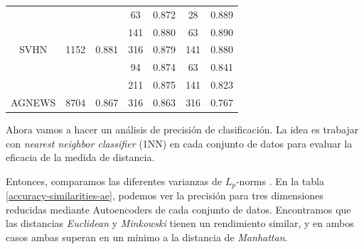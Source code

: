 \begin{table}[]
\begin{tabular}{c|cc|cccc|}
\multicolumn{1}{|c|}{}                          & \cellcolor[HTML]{E6E6E6}                          &                         & \cellcolor[HTML]{E6E6E6}63                        & 0.872                     & \cellcolor[HTML]{E6E6E6}28                        & 0.889 \\
\multicolumn{1}{|c|}{}                          & \cellcolor[HTML]{E6E6E6}                          &                         & \cellcolor[HTML]{E6E6E6}141                       & 0.880                     & \cellcolor[HTML]{E6E6E6}63                        & 0.890 \\
\multicolumn{1}{|c|}{\multirow{-3}{*}{SVHN}}    & \multirow{-3}{*}{\cellcolor[HTML]{E6E6E6}1152}    & \multirow{-3}{*}{0.881} & \cellcolor[HTML]{E6E6E6}316                       & 0.879                     & \cellcolor[HTML]{E6E6E6}141                       & 0.880 \\ \hline
\multicolumn{1}{|c|}{}                          & \cellcolor[HTML]{E6E6E6}                          &                         & \cellcolor[HTML]{E6E6E6}94                        & 0.874                     & \cellcolor[HTML]{E6E6E6}63                        & 0.841 \\
\multicolumn{1}{|c|}{}                          & \cellcolor[HTML]{E6E6E6}                          &                         & \cellcolor[HTML]{E6E6E6}211                       & 0.875                     & \cellcolor[HTML]{E6E6E6}141                       & 0.823 \\
\multicolumn{1}{|c|}{\multirow{-3}{*}{AGNEWS}}  & \multirow{-3}{*}{\cellcolor[HTML]{E6E6E6}8704}    & \multirow{-3}{*}{0.867} & \cellcolor[HTML]{E6E6E6}316                       & 0.863                     & \cellcolor[HTML]{E6E6E6}316                       & 0.767 \\ \hline
\end{tabular}
\end{table}

Ahora vamos a hacer un análisis de precisión de clasificación. La idea es trabajar con \textit{nearest neighbor classifier} (1NN) en cada conjunto de datos para evaluar la eficacia de la medida de distancia.

Entonces, comparamos las diferentes varianzas de $ L_p $-norms \cite{sutherland1975introduction}. En la tabla \ref{accuracy-similarities-ae}, podemos ver la precisión para tres dimensiones reducidas mediante Autoencoders de cada conjunto de datos. Encontramos que las distancias \textit{Euclidean} \cite{Gower82} y \textit{Minkowski} tienen un rendimiento similar, y en ambos casos ambas superan en un mínimo a la distancia de \textit{Manhattan}.

